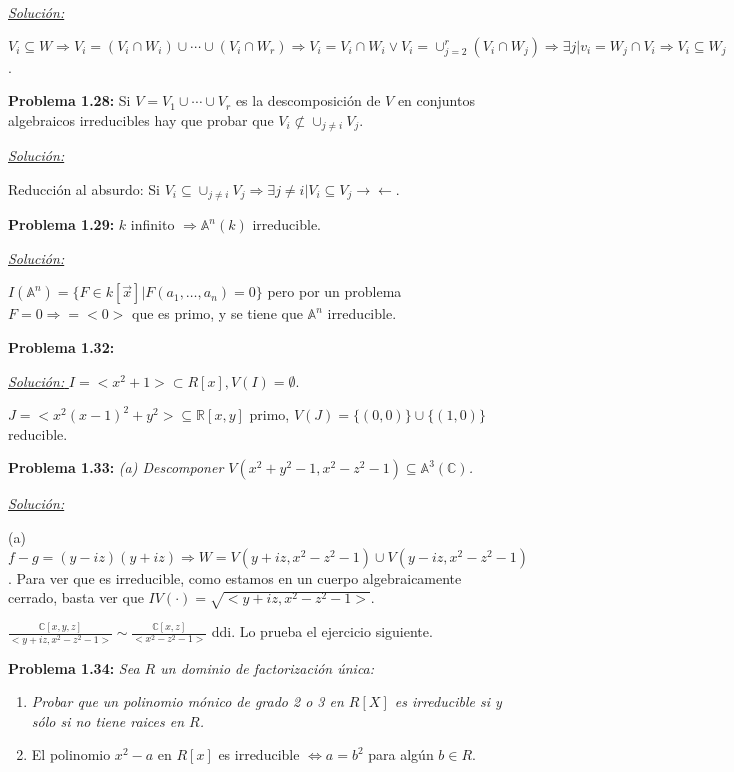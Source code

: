 \underline{\textit{Solución: }}

$V_i\subseteq W \Rightarrow V_i=(V_i\cap W_i)\cup \cdots \cup (V_i\cap W_r) \Rightarrow V_i= V_i\cap W_i \vee V_i = \cup_{j=2}^r(V_i\cap W_j) \Rightarrow \exists j  | v_i=W_j\cap V_i \Rightarrow V_i\subseteq W_j$.

\vspace{2mm}
\textbf{Problema 1.28: } Si $V=V_1\cup \cdots \cup V_r$ es la descomposición de $V$ en conjuntos algebraicos irreducibles hay que probar que $V_i \not \subset \cup_{j\neq i}V_j$.

\underline{\textit{Solución: }}

Reducción al absurdo: Si $V_i\subseteq \cup_{j\neq i}V_j \Rightarrow \exists j\neq i | V_i \subseteq V_j \rightarrow \leftarrow $.

\vspace{2mm}
\textbf{Problema 1.29: } $k$ infinito $\Rightarrow \mathbb{A}^n(k)$ irreducible.

\underline{\textit{Solución: }}

$I(\mathbb{A}^n)= \{F\in k[\vec{x}] | F(a_1,\dots,a_n)=0\}$ pero por un problema $F=0 \Rightarrow =<0>$ que es primo, y se tiene que $\mathbb{A}^n $ irreducible.

\vspace{2mm}
\textbf{Problema 1.32:}

\underline{\textit{Solución: }}
$I=<x^2+1>\subset R[x], V(I)=\emptyset $.

$J=<x^2(x-1)^2+y^2>\subseteq \mathbb{R}[x,y]$ primo, $V(J)=\{(0,0)\}\cup \{(1,0)\}$ reducible.

\vspace{2mm}
\textbf{Problema 1.33:} \textit{(a) Descomponer $V(x^2+y^2-1,x^2-z^2-1)\subseteq \mathbb{A}^3(\mathbb{C})$.}

\underline{\textit{Solución: }}

(a) $f-g=(y-iz)(y+iz) \Rightarrow W=V(y+iz,x^2-z^2-1)\cup V(y-iz,x^2-z^2-1)$. Para ver que es irreducible, como estamos en un cuerpo algebraicamente cerrado, basta ver que $IV(\cdot)=\sqrt{<y+iz,x^2-z^2-1>}$. 

$\frac{\mathbb{C}[x,y,z]}{<y+iz,x^2-z^2-1>} \sim \frac{\mathbb{C}[x,z]}{<x^2-z^2-1>}$ ddi. Lo prueba el ejercicio siguiente.

\textbf{Problema 1.34: } \textit{Sea $R$ un dominio de factorización única:}
\begin{enumerate}
\item \textit{Probar que un polinomio mónico de grado 2 o 3 en $R[X]$ es irreducible si y sólo si no tiene raices en $R$.}
\item El polinomio $x^2-a$ en $R[x]$ es irreducible $\Leftrightarrow a=b^2$ para algún $b\in R$. 
\end{enumerate}

